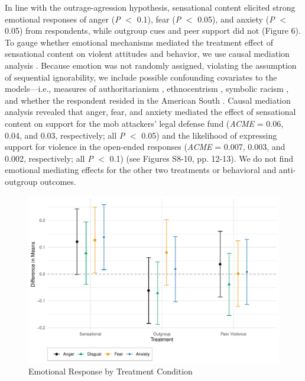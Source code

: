 In line with the outrage-agression hypothesis, sensational content elicited strong emotional responses of anger (\textit{P} $<$ 0.1), fear (\textit{P} $<$ 0.05), and anxiety (\textit{P} $<$ 0.05) from respondents, while outgroup cues and peer support did not (Figure 6). To gauge whether emotional mechanisms mediated the treatment effect of sensational content on violent attitudes and behavior, we use causal mediation analysis \citep{imai2011commentary}. Because emotion was not randomly assigned, violating the assumption of sequential ignorability, we include possible confounding covariates to the models---i.e., measures of authoritarianism \citep{stenner2005authoritarian}, ethnocentrism \citep{kinder2010us}, symbolic racism \citep{banks2014anger}, and whether the respondent resided in the American South \citep{nisbett1996culture}. Causal mediation analysis revealed that anger, fear, and anxiety mediated the effect of sensational content on support for the mob attackers' legal defense fund (\textit{ACME} = 0.06, 0.04, and 0.03, respectively; all \textit{P} $<$ 0.05) and the likelihood of expressing support for violence in the open-ended responses (\textit{ACME} = 0.007, 0.003, and 0.002, respectively; all \textit{P} $<$ 0.1) (see Figures S8-10, pp. 12-13). We do not find emotional mediating effects for the other two treatments or behavioral and anti-outgroup outcomes.

\begin{figure}[!htbp]
  \centering
  \caption{Emotional Response by Treatment Condition}
  \includegraphics[width=.835\textwidth]{figures/ATE_emotion.pdf}
\end{figure}

